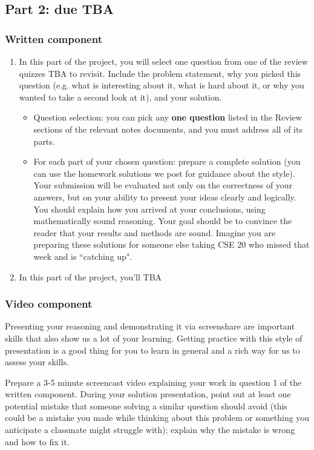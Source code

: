 \documentclass[12pt, oneside]{article}
\begin{document}
\newpage
\subsection*{Part 2: due TBA}
\subsubsection*{Written component}
\begin{enumerate}
\item In this part of the project, you will select one question from one of the review quizzes 
TBA to revisit. 
Include the problem statement, why you picked this question (e.g. what is interesting about it, 
what is hard about it, or why you wanted to take a second look at it), and your solution. 
    \begin{itemize}
        \item Question selection: you can pick any {\bf one question} listed in the Review 
        sections of the relevant notes documents, and you must address all of its parts.
        \item For each part of your chosen question: prepare a complete solution 
        (you can use the homework solutions we post for guidance about the style). 
        Your submission will be evaluated not only on the correctness of your answers, 
        but on your ability to present your ideas clearly and logically. 
        You should explain how you arrived at your conclusions, using mathematically 
        sound reasoning. Your goal should be to convince the reader that your results 
        and methods are sound. Imagine you are preparing these solutions for someone else 
        taking CSE 20 who missed that week and is ``catching up".
    \end{itemize}
\item In this part of the project, you'll TBA

\end{enumerate}

\subsubsection*{Video component}

Presenting your reasoning and demonstrating it via screenshare are important skills that 
also show us a lot of your learning. Getting practice with this style of presentation 
is a good thing for you to learn in general and a rich way for us to assess your skills. 

Prepare a 3-5 minute screencast video explaining your work in question 1 of the written component.
During your solution presentation, point out at least one potential mistake that someone 
solving a similar question should avoid (this could be a mistake you made while thinking 
about this problem or something you anticipate a classmate might struggle with); 
explain why the mistake is wrong and how to fix it. 
\end{document}
